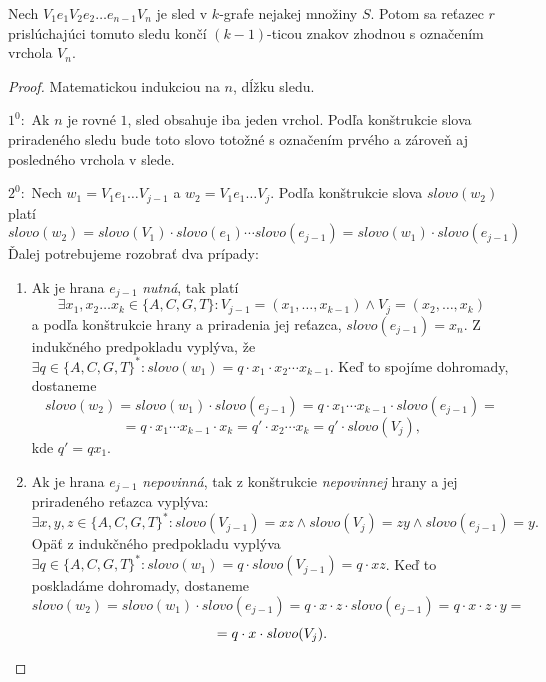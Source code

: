 \begin{lema}
\label{vertex_end_lemma}
    Nech $V_1 e_1 V_2 e_2 \ldots e_{n-1} V_n$ je sled v $k$-grafe nejakej množiny $S$.
    Potom sa reťazec $r$ prislúchajúci tomuto sledu končí $(k-1)$-ticou znakov zhodnou
    s označením vrchola $V_n$.
\end{lema}

\begin{proof}
    Matematickou indukciou na $n$, dĺžku sledu.
   
    $1^0:$ Ak $n$ je rovné $1$, sled obsahuje iba jeden vrchol. Podľa konštrukcie slova
           priradeného sledu bude toto slovo totožné s označením prvého a zároveň aj
           posledného vrchola v slede.

    $2^0:$ Nech $w_1 = V_1 e_1 \ldots V_{j-1}$ a $w_2 = V_1 e_1 \ldots V_j$. Podľa konštrukcie slova $slovo(w_2)$ platí
           $$ slovo(w_2) = slovo(V_1) \cdot slovo(e_1) \cdots slovo(e_{j-1}) = slovo(w_1) \cdot slovo(e_{j-1})$$
           Ďalej potrebujeme rozobrať dva prípady:
           \begin{enumerate}
            \item Ak je hrana $e_{j-1}$ \emph{nutná}, tak platí
                  $$ \exists x_1, x_2 \ldots x_k \in \{A, C, G, T \}: V_{j-1} = (x_1, \ldots , x_{k-1}) \wedge V_j = (x_2, \ldots , x_k)$$
                  a podľa konštrukcie hrany a priradenia jej reťazca, $slovo(e_{j-1}) = x_n$.
                  Z indukčného predpokladu vyplýva, že $\exists q \in \{ A, C, G, T\}^*: slovo(w_1) = q \cdot x_1 \cdot x_2 \cdots x_{k-1}$. Keď to
                  spojíme dohromady, dostaneme
                  $$ slovo(w_2) = slovo(w_1) \cdot slovo(e_{j - 1}) = q \cdot x_1 \cdots x_{k - 1} \cdot slovo(e_{j - 1}) = $$
                  $$ = q \cdot x_1 \cdots x_{k - 1} \cdot x_k = q' \cdot x_2 \cdots x_k = q' \cdot slovo(V_j),$$
                  kde $q' = qx_1$.

            \item Ak je hrana $e_{j - 1}$ \emph{nepovinná}, tak z konštrukcie \emph{nepovinnej} hrany a jej priradeného reťazca
                  vyplýva:
                  $$ \exists x, y, z \in \{ A, C, G, T\}^* : slovo(V_{j - 1}) = xz \wedge slovo(V_{j}) = zy \wedge slovo(e_{j - 1}) = y.$$
                  Opäť z indukčného predpokladu vyplýva $ \exists q \in \{A, C, G, T\}^*: slovo(w_1) = q \cdot slovo(V_{j-1}) = q \cdot xz$.
                  Keď to poskladáme dohromady, dostaneme
                  $$ slovo(w_2) = slovo(w_1) \cdot slovo(e_{j - 1}) = q \cdot x \cdot z \cdot slovo(e_{j - 1}) = q \cdot x \cdot z \cdot y = $$
                  $$ = q \cdot x \cdot slovo(V_j).\qedhere$$

           \end{enumerate}
\end{proof}

